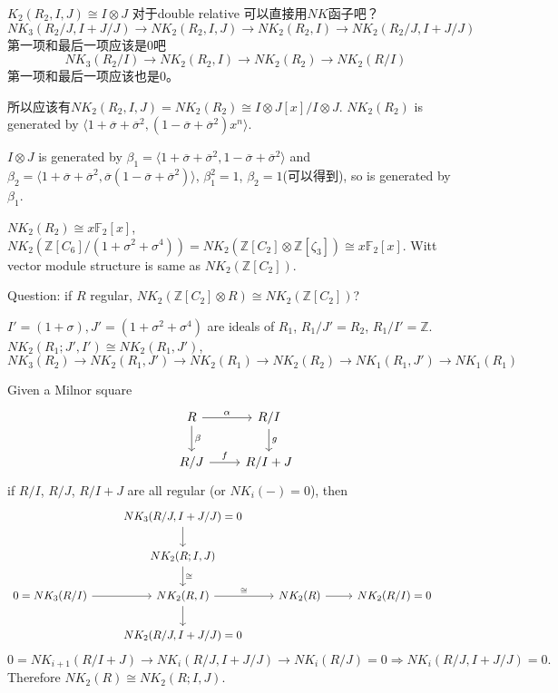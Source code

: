 $K_2(R_2,I,J)\cong I\otimes J$
对于double relative 可以直接用$NK$函子吧？
\[NK_3(R_2/J,I+J/J)\longrightarrow NK_2(R_2,I,J)\longrightarrow NK_2(R_2,I)\longrightarrow NK_2(R_2/J,I+J/J)\]
第一项和最后一项应该是$0$吧
\[NK_3(R_2/I)\longrightarrow NK_2(R_2,I)\longrightarrow NK_2(R_2)\longrightarrow NK_2(R/I)\]
第一项和最后一项应该也是$0$。

所以应该有$NK_2(R_2,I,J)=NK_2(R_2)\cong I\otimes J[x]/I\otimes J$. $NK_2(R_2)$ is generated by $\langle 1+\overline{\sigma}+\overline{\sigma}^2,(1-\overline{\sigma}+\overline{\sigma}^2)x^n \rangle$.

$I\otimes J$ is generated by $\beta_1=\langle 1+\overline{\sigma}+\overline{\sigma}^2,1-\overline{\sigma}+\overline{\sigma}^2 \rangle$ and $\beta_2=\langle 1+\overline{\sigma}+\overline{\sigma}^2,\overline{\sigma}(1-\overline{\sigma}+\overline{\sigma}^2) \rangle$, $\beta_1^2=1$, $\beta_2=1$(可以得到), so is generated by $\beta_1$.

$NK_2(R_2)\cong x \mathbb{F}_2[x]$, $NK_2(\mathbb{Z}[C_6]/(1+\sigma^2+\sigma^4))=NK_2(\mathbb{Z}[C_2]\otimes \mathbb{Z}[\zeta_3])\cong x \mathbb{F}_2[x]$. Witt vector module structure is same as $NK_2(\mathbb{Z}[C_2])$.

Question: if $R$ regular, $NK_2(\mathbb{Z}[C_2]\otimes R)\cong NK_2(\mathbb{Z}[C_2])$?

$I'=(1+\sigma), J'=(1+\sigma^2+\sigma^4)$ are ideals of $R_1$, $R_1/J'=R_2$, $R_1/I'=\mathbb{Z}$. $NK_2(R_1;J',I')\cong NK_2(R_1,J')$,
\[NK_3(R_2)\longrightarrow NK_2(R_1,J')\longrightarrow NK_2(R_1)\longrightarrow NK_2(R_2)\longrightarrow NK_1(R_1,J')\longrightarrow NK_1(R_1)\]

Given a Milnor square
\[\begin{tikzcd}
		R \ar[r,"\alpha"] \ar[d,"\beta"]& R/I\ar[d,"g"]\\
		R/J \ar[r,"f"] & R/I+J
	\end{tikzcd}\]
if $R/I$, $R/J$, $R/I+J$ are all regular (or $NK_i(-)=0$), then
\[\begin{tikzcd}
	 & NK_3(R/J,I+J/J)=0 \ar[d] & & & \\
	 & NK_2(R;I,J) \ar[d,"\cong"] \\
0=NK_3(R/I)	\ar[r] & NK_2(R,I) \ar[r,"\cong"] \ar[d] & NK_2(R) \ar[r] &NK_2(R/I)=0\\
	& NK_2(R/J,I+J/J)=0 
\end{tikzcd}
\]
\[0=NK_{i+1}(R/I+J)\longrightarrow NK_i(R/J,I+J/J)\longrightarrow NK_i(R/J)=0 \Longrightarrow NK_i(R/J,I+J/J)=0.\]
Therefore $NK_2(R)\cong NK_2(R;I,J)$.

